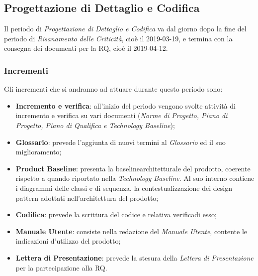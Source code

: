 \newpage
\subsection{Progettazione di Dettaglio e Codifica}
\label{PDC}
Il periodo di \textit{Progettazione di Dettaglio e Codifica} va dal giorno dopo la fine del periodo di \textit{Risanamento delle Criticità}, cioè il 2019-03-19, e termina con la consegna dei documenti per la RQ, cioè il 2019-04-12.\\

\subsubsection{Incrementi}
Gli incrementi che si andranno ad attuare durante questo periodo sono:
\begin{itemize}
	\item \textbf{Incremento e verifica}: all'inizio del periodo vengono svolte attività di incremento e verifica su vari documenti (\textit{Norme di Progetto, Piano di Progetto, Piano di Qualifica e Technology Baseline});
	\item \textbf{Glossario}: prevede l'aggiunta di nuovi termini al \textit{Glossario} ed il suo miglioramento;
	\item \textbf{Product Baseline}\glossario: presenta la baseline\glossario architetturale del prodotto, coerente rispetto a quando riportato nella \textit{Technology Baseline}. Al suo interno contiene i diagrammi delle classi e di sequenza, la contestualizzazione dei design pattern adottati nell'architettura del prodotto; 
	\item \textbf{Codifica}: prevede la scrittura del codice e relativa verifica\glossario di esso;
	\item \textbf{Manuale Utente}: consiste nella redazione del \textit{Manuale Utente}, contente le indicazioni d'utilizzo del prodotto;
	\item \textbf{Lettera di Presentazione}: prevede la stesura della \textit{Lettera di Presentazione} per la partecipazione alla RQ.
\end{itemize}


